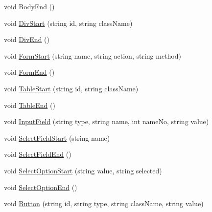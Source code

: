 \begin{DoxyCompactItemize}
\item 
void \hyperlink{classPageStructureMaker_ac91e234e2d54dedd9d7e556fabf21d2b}{Body\-End} ()
\item 
void \hyperlink{classPageStructureMaker_a927f92889555dd316c129f706be86a5c}{Div\-Start} (string id, string class\-Name)
\item 
void \hyperlink{classPageStructureMaker_a2913e76bf188ed777dcd33003ef6207d}{Div\-End} ()
\item 
void \hyperlink{classPageStructureMaker_a3f25d5b844a2251883acb80d8fabb77d}{Form\-Start} (string name, string action, string method)
\item 
void \hyperlink{classPageStructureMaker_a65d97f23bb543f3db5201b2009f7f65a}{Form\-End} ()
\item 
void \hyperlink{classPageStructureMaker_a04e68e69005f3933e0f496c3db474daf}{Table\-Start} (string id, string class\-Name)
\item 
void \hyperlink{classPageStructureMaker_a7f8fefbe7a825c1b7761fc8a0f1bb8e4}{Table\-End} ()
\item 
void \hyperlink{classPageStructureMaker_a3547027801e298307527f1e934787b13}{Input\-Field} (string type, string name, int name\-No, string value)
\item 
void \hyperlink{classPageStructureMaker_ae8684bb66ca463e2f92e09c96137f9e3}{Select\-Field\-Start} (string name)
\item 
void \hyperlink{classPageStructureMaker_a81eb3cdbc840a4c8165cef87330ade09}{Select\-Field\-End} ()
\item 
void \hyperlink{classPageStructureMaker_a77856078e74dab25329132ea07466f92}{Select\-Option\-Start} (string value, string selected)
\item 
void \hyperlink{classPageStructureMaker_a7682f479f7f1012d426ec9f9535def60}{Select\-Option\-End} ()
\item 
void \hyperlink{classPageStructureMaker_a419feca1cfdb50e1be757eb1c2707a73}{Button} (string id, string type, string class\-Name, string value)
\end{DoxyCompactItemize}
